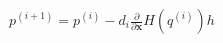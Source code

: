 \documentclass[preview]{standalone}
\begin{document}
\begin{align*}
p^{(i+1)}=p^{(i)}-d_i\frac{\partial}{\partial\mathbf x}H(q^{(i)})h
\end{align*}
\end{document}

